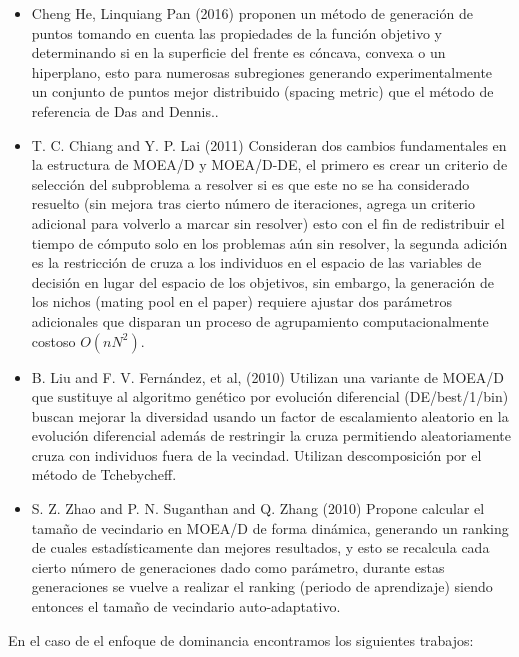 \documentclass[letterpaper,10pt]{article}
\begin{document}
\begin{itemize}
 \item Cheng He, Linquiang Pan (2016) proponen un método de generación de puntos tomando en cuenta las propiedades de la función objetivo y determinando si en la superficie del frente es cóncava, convexa o un hiperplano, esto para numerosas subregiones generando experimentalmente un conjunto de puntos mejor distribuido (spacing metric) que el método de referencia de Das and Dennis.\cite{7748353}.    
 \item T. C. Chiang and Y. P. Lai (2011) Consideran dos cambios fundamentales en la estructura de MOEA/D y MOEA/D-DE, el primero es crear un criterio de selección del subproblema a resolver si es que este no se ha considerado resuelto (sin mejora tras cierto número de iteraciones, agrega un criterio adicional para volverlo a marcar sin resolver) esto con el fin de redistribuir el tiempo de cómputo solo en los problemas aún sin resolver, la segunda adición es la restricción de cruza a los individuos en el espacio de las variables de decisión en lugar del espacio de los objetivos, sin embargo, la generación de los nichos (mating pool en el paper) requiere ajustar dos parámetros adicionales que disparan un proceso de agrupamiento computacionalmente costoso $O(nN^2)$.\cite{5949789}
 \item B. Liu and F. V. Fernández, et al, (2010) Utilizan una variante de MOEA/D que sustituye al algoritmo genético por evolución diferencial (DE/best/1/bin) buscan mejorar la diversidad usando un factor de escalamiento aleatorio en la evolución diferencial además de restringir la cruza permitiendo aleatoriamente cruza con individuos fuera de la vecindad. Utilizan descomposición por el método de Tchebycheff. \cite{5585957}
 \item S. Z. Zhao and P. N. Suganthan and Q. Zhang (2010) Propone calcular el tamaño de vecindario en MOEA/D de forma dinámica, generando un ranking de cuales estadísticamente dan mejores resultados, y esto se recalcula cada cierto número de generaciones dado como parámetro, durante estas generaciones se vuelve a realizar el ranking (periodo de aprendizaje) siendo entonces el tamaño de vecindario auto-adaptativo. \cite{6151117}
\end{itemize}

En el caso de el enfoque de dominancia encontramos los siguientes trabajos:
\end{document}
